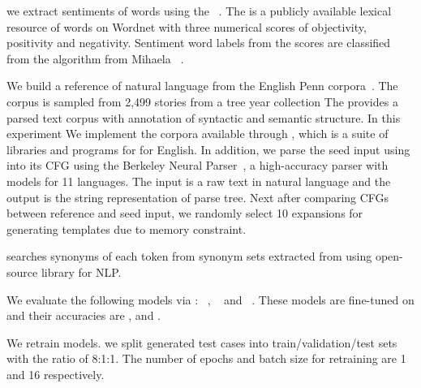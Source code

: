%
we extract sentiments of words using the
\Swn~\cite{baccianella2010sentiwordnet}. The \Swn is a publicly
available lexical resource of words on Wordnet with three numerical
scores of objectivity, positivity and negativity. Sentiment word
labels from the scores are classified from the algorithm from Mihaela
\etal~\cite{mihaela2017sentiwordnetlabel}.

%
We build a reference \Cfg of natural language from the English Penn
\Trb corpora~\cite{mitchell1993treebank,nltkTreebankCorporaWebPage}.
The corpus is sampled from 2,499 stories from a tree year \Wsj
collection The \Trb provides a parsed text corpus with annotation of
syntactic and semantic structure. In this experiment We implement the
\trb corpora available through \Nltk, which is a suite of libraries
and programs for \Nlp for English. In addition, we parse the seed
input using into its CFG using the Berkeley Neural
Parser~\cite{kitaev2018constituency, kitaev2019multilingual}, a
high-accuracy parser with models for 11 languages. The input is a raw
text in natural language and the output is the string representation of
parse tree. Next after comparing CFGs between reference and seed input,
we randomly select 10 expansions for generating templates due to
memory constraint.

%
\Model searches synonyms of each token from synonym sets extracted
from \Wrdnt using \Spacy open-source library for NLP.

%
We evaluate the following \sa models via \Model:
\Bert~\cite{devlin2019bert}, \Roberta~\cite{liu2019roberta} and
\Dbert~\cite{sanh2019distilbert}. These models are fine-tuned on \Sstt
and their accuracies are \BertAcc, \RobertaAcc and \DbertAcc.

%
We retrain \sa models. we split \Model generated test cases into
train/validation/test sets with the ratio of 8:1:1. The number of
epochs and batch size for retraining are 1 and 16 respectively.
